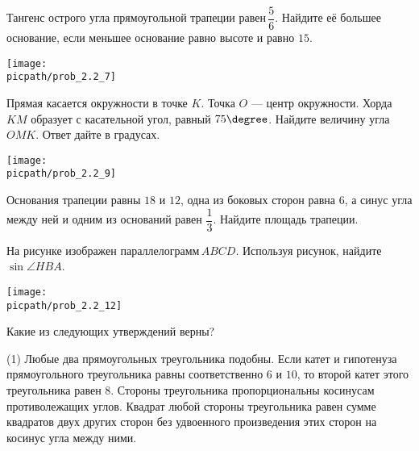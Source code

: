 \begin{training}[2]
\begin{listofex}
		\foranswer
		\item
		\begin{minipage}[t]{\bodywidth}
			Тангенс острого угла прямоугольной трапеции равен \( \dfrac{5}{6} \).  Найдите её большее основание, если меньшее основание равно высоте и равно \( 15 \).
			\foranswer
		\end{minipage}
		\gapwidth
		\begin{minipage}[t]{\picwidth}
			\texttt{[image: \\picpath/prob\_2.2\_7]}
		\end{minipage}
		\item 
		\begin{minipage}[t]{\bodywidth}
			Прямая касается окружности в точке \( K \). Точка \( O \) --- центр окружности. Хорда \( KM \) образует с касательной угол, равный \( 75\degree \). Найдите величину угла \( OMK \). Ответ дайте в градусах.
			\foranswer
		\end{minipage}
		\gapwidth
		\begin{minipage}[t]{\picwidth}
			\texttt{[image: \\picpath/prob\_2.2\_9]}
		\end{minipage}
		\item Основания трапеции равны \( 18 \) и \( 12 \), одна из боковых сторон равна \( 6 \), а синус угла между ней и одним из оснований равен \( \dfrac{1}{3} \).  Найдите площадь трапеции.
		\foranswer
		\item \begin{minipage}[t]{\bodywidth}
			На рисунке изображен параллелограмм \( ABCD \). Используя рисунок, найдите \( \sin\angle HBA \).
			\foranswer
		\end{minipage}
		\gapwidth
		\begin{minipage}[t]{\picwidth}
			\texttt{[image: \\picpath/prob\_2.2\_12]}
		\end{minipage}
		\item Какие из следующих утверждений верны?
		\begin{tasks}(1)
			\task Любые два прямоугольных треугольника подобны.
			\task Если катет и гипотенуза прямоугольного треугольника равны соответственно \( 6 \) и \( 10 \), то второй катет этого треугольника равен \( 8 \).
			\task Стороны треугольника пропорциональны косинусам противолежащих углов.
			\task Квадрат любой стороны треугольника равен сумме квадратов двух других сторон без удвоенного произведения этих сторон на косинус угла между ними.
		\end{tasks}
		\foranswer

\end{listofex}
\end{training}

